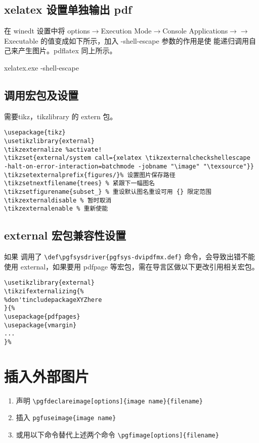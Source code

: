\subsection{xelatex 设置单独输出 pdf}
在 winedt 设置中将 options$\rightarrow$Execution Mode$\rightarrow$Console Applications$\rightarrow$\XeLaTeX$\rightarrow$Executable 的值变成如下所示，加入 -shell-escape 参数的作用是使 \XeLaTeX 能递归调用自己来产生图片。pdflatex 同上所示。
\begin{cmd}
  xelatex.exe -shell-escape
\end{cmd}
\subsection{调用宏包及设置}
需要tikz，tikzlibrary 的 extern 包。
\begin{lstlisting}[language={[LaTeX]TeX}]
\usepackage{tikz}
\usetikzlibrary{external}
\tikzexternalize %activate!
\tikzset{external/system call={xelatex \tikzexternalcheckshellescape
-halt-on-error-interaction=batchmode -jobname "\image" "\texsource"}}
\tikzsetexternalprefix{figures/}% 设置图片保存路径
\tikzsetnextfilename{trees} % 紧跟下一幅图名
\tikzsetfigurename{subset_} % 重设默认图名重设可用 {} 限定范围
\tikzexternaldisable % 暂时取消
\tikzexternalenable % 重新使能
\end{lstlisting}
\subsection{external 宏包兼容性设置}
如果 \XeLaTeX 调用了 \verb|\def\pgfsysdriver{pgfsys-dvipdfmx.def}| 命令，会导致出错不能使用 external，如果要用 pdfpage 等宏包，需在导言区做以下更改引用相关宏包。
\begin{lstlisting}[language={[LaTeX]TeX}]
\usetikzlibrary{external}
\tikzifexternalizing{%
%don'tincludepackageXYZhere
}{%
\usepackage{pdfpages}
\usepackage{vmargin}
...
}%
\end{lstlisting}

\section{插入外部图片}

\begin{enumerate}
  \item 声明 \verb|\pgfdeclareimage[options]{image name}{filename}|
  \item 插入 \verb|pgfuseimage{image name}|
  \item 或用以下命令替代上述两个命令 \verb|\pgfimage[options]{filename}|
\end{enumerate}


